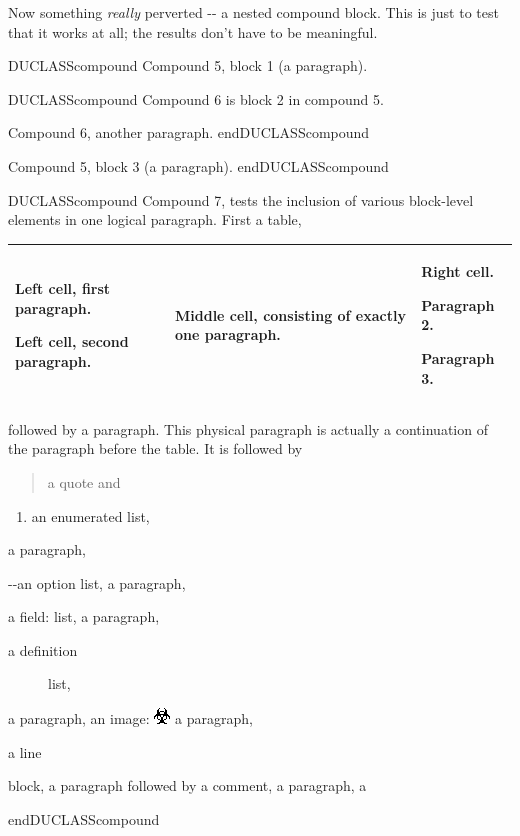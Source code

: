 \documentclass[a4paper]{memoir}
\newlength{\DUtablewidth} %
\newenvironment{DUclass}[1]%
  {%
   \def\DocutilsClassFunctionName{DUCLASS#1}
     \csname \DocutilsClassFunctionName \endcsname}%
  {\csname end\DocutilsClassFunctionName \endcsname}%
\newenvironment{DUfieldlist}%
    {\quote\description}
    {\enddescription\endquote}
\newenvironment{DUlineblock}[1]{%
    \list{}{\setlength{\partopsep}{\parskip}
            \addtolength{\partopsep}{\baselineskip}
            \setlength{\topsep}{0pt}
            \setlength{\itemsep}{0.15\baselineskip}
            \setlength{\parsep}{0pt}
            \setlength{\leftmargin}{#1}}
    \raggedright
  }
  {\endlist}
\providecommand*{\DUoptionlistlabel}[1]{\bfseries #1 \hfill}
\newenvironment{DUoptionlist}{%
    \list{}{\setlength{\labelwidth}{\DUoptionlistindent}
            \setlength{\rightmargin}{1cm}
            \setlength{\leftmargin}{\rightmargin}
            \addtolength{\leftmargin}{\labelwidth}
            \addtolength{\leftmargin}{\labelsep}
            \renewcommand{\makelabel}{\DUoptionlistlabel}}
  }
  {\endlist}
\begin{document}
Now something \emph{really} perverted -{}- a nested compound block.  This is
just to test that it works at all; the results don't have to be
meaningful.

\begin{DUclass}{compound}
Compound 5, block 1 (a paragraph).

\begin{DUclass}{compound}
Compound 6 is block 2 in compound 5.

Compound 6, another paragraph.
\end{DUclass}

Compound 5, block 3 (a paragraph).
\end{DUclass}

\begin{DUclass}{compound}
Compound 7, tests the inclusion of various block-level
elements in one logical paragraph. First a table,

\setlength{\DUtablewidth}{\linewidth}%
\begin{longtable*}{|p{0.249\DUtablewidth}|p{0.249\DUtablewidth}|p{0.249\DUtablewidth}|}
\hline

Left cell, first
paragraph.

Left cell, second
paragraph.
 & 
Middle cell,
consisting of
exactly one
paragraph.
 & 
Right cell.

Paragraph 2.

Paragraph 3.
 \\
\hline
\end{longtable*}
followed by a paragraph. This physical paragraph is
actually a continuation of the paragraph before the table. It is followed
by
\begin{quote}
a quote and
\end{quote}
\begin{enumerate}
\item an enumerated list,
\end{enumerate}
a paragraph,
\begin{DUoptionlist}
\item[-{}-an]  option list,
\end{DUoptionlist}
a paragraph,
\begin{DUfieldlist}
\item[{a field:}]
list,
\end{DUfieldlist}
a paragraph,
\begin{description}
\item[{a definition}] \leavevmode 
list,

\end{description}
a paragraph, an image:
\includegraphics{../../../docs/user/rst/images/biohazard.png}
a paragraph,
\begin{DUlineblock}{0em}
\item[] a line
\item[] block,
\end{DUlineblock}
a paragraph followed by a comment,
a paragraph, a


\end{DUclass}
\end{document}
